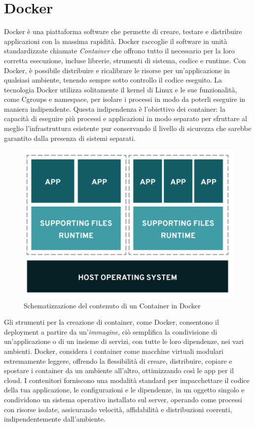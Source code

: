 \section{Docker}
Docker è una piattaforma software che permette di creare, testare e distribuire applicazioni con la massima rapidità. Docker raccoglie 
il software in unità standardizzate chiamate \textit{Container} che offrono tutto il necessario per la loro corretta esecuzione, incluse librerie, 
strumenti di sistema, codice e runtime. Con Docker, è possibile distribuire e ricalibrare le risorse per un'applicazione in qualsiasi ambiente, 
tenendo sempre sotto controllo il codice eseguito.\hfill\break
La tecnologia Docker utilizza solitamente il kernel di Linux e le sue funzionalità, come Cgroups e namespace, per isolare i processi in modo da poterli 
eseguire in maniera indipendente. Questa indipendenza è l'obiettivo dei container: la capacità di eseguire più processi e applicazioni in 
modo separato per sfruttare al meglio l'infrastruttura esistente pur conservando il livello di sicurezza che sarebbe garantito dalla 
presenza di sistemi separati.
%
\begin{figure}[ht!]
    \centering
    \includegraphics[scale=0.7]{images/Docker_Config_Container.png}
    \caption{Schematizzazione del contenuto di un Container in Docker}
    \label{fig:DCC}
\end{figure}
\hfill\break
Gli strumenti per la creazione di container, come Docker, consentono il deployment a partire da un'\textit{immagine}, ciò semplifica la condivisione di 
un'applicazione o di un insieme di servizi, con tutte le loro dipendenze, nei vari ambienti.
Docker, considera i container come macchine virtuali modulari estremamente leggere, offrendo la flessibilità di creare, distribuire, 
copiare e spostare i container da un ambiente all'altro, ottimizzando così le app per il cloud.\hfill\break
I contenitori forniscono una modalità standard per impacchettare il codice della tua applicazione, le configurazioni e le dipendenze, in un oggetto singolo e 
condividono un sistema operativo installato sul server, operando come processi con risorse isolate, assicurando velocità, affidabilità e distribuzioni coerenti, 
indipendentemente dall’ambiente.
%
